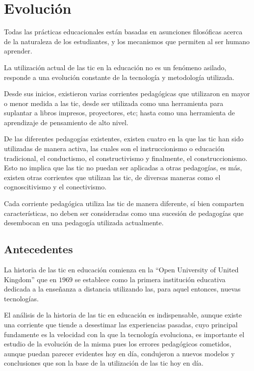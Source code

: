 \section{Evolución}
\label{sec:tics_educacion}

Todas las prácticas educacionales están basadas en asunciones filosóficas acerca
de la naturaleza de los estudiantes, y los mecanismos que permiten al ser humano
aprender\cite{johnson2005instructionism}.

La utilización actual de las \Gls{tic} en la educación no es un fenómeno
asilado, responde a una evolución constante de la tecnología y metodología
utilizada.

Desde sus inicios, existieron varias corrientes pedagógicas que utilizaron en
mayor o menor medida a las \Gls{tic}, desde ser utilizada como una herramienta
para suplantar a libros impresos, proyectores,
etc\cite{nanjappa2003constructing}; hasta como una herramienta de aprendizaje
de pensamiento de alto
nivel\cite{egenfeldt2007third,white:ict,nanjappa2003constructing}.

De las diferentes pedagogías existentes, existen cuatro en la que las \Gls{tic}
han sido utilizadas de manera activa, las cuales son el instruccionismo o
educación tradicional, el conductismo, el constructivismo y finalmente, el
construccionismo. Esto no implica que las \Gls{tic} no puedan ser aplicadas
a otras pedagogías, es más, existen otras corrientes que utilizan las \Gls{tic},
de diversas maneras como el cognoscitivismo\cite{egenfeldt2007third} y el
conectivismo\cite{white:ict}. 

Cada corriente pedagógica utiliza las \Gls{tic} de manera diferente, sí bien
comparten características, no deben ser consideradas como una sucesión de
pedagogías que desembocan en una pedagogía utilizada actualmente.

\subsection{Antecedentes}

La historia de las \Gls{tic} en educación comienza en la \enquote{Open
    University of United Kingdom} que en $1969$ se establece como la primera
institución educativa dedicada a la enseñanza a distancia utilizando las, para
aquel entonces, nuevas tecnologías\cite{tinio:ict}. 

El análisis de la historia de las \Gls{tic} en educación es indispensable,
aunque existe una corriente que tiende a desestimar las experiencias pasadas,
cuyo principal fundamente es la velocidad con la que la tecnología evoluciona,
es importante el estudio de la evolución de la misma pues los errores
pedagógicos cometidos, aunque puedan parecer evidentes hoy en día, condujeron a
nuevos modelos y conclusiones que son la base de la utilización de las \Gls{tic}
hoy en día\cite{mcdougall2006theory}.

